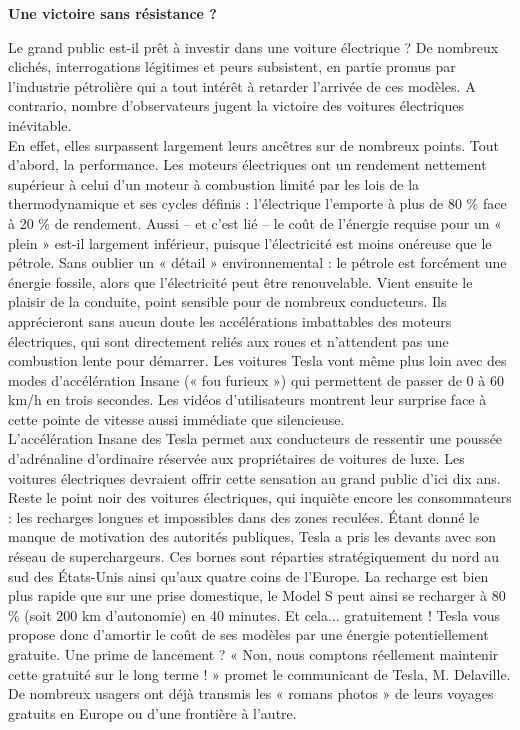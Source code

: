 \documentclass[8pt]{article}
\begin{document}
\textbf{Une victoire sans résistance ?}

Le grand public est-il prêt à investir dans une voiture électrique ? De nombreux clichés, interrogations légitimes et peurs subsistent, en partie promus par l’industrie pétrolière qui a tout intérêt à retarder l’arrivée de ces modèles. A contrario, nombre d’observateurs jugent la victoire des voitures électriques inévitable. \\

En effet, elles surpassent largement leurs ancêtres sur de nombreux points. Tout d’abord, la performance. Les moteurs électriques ont un rendement nettement supérieur à celui d’un moteur à combustion limité par les lois de la thermodynamique et ses cycles définis : l’électrique l’emporte à plus de 80 \% face à 20 \% de rendement. Aussi – et c’est lié – le coût de l’énergie requise pour un « plein » est-il largement inférieur, puisque l’électricité est moins onéreuse que le pétrole. Sans oublier un « détail » environnemental : le pétrole est forcément une énergie fossile, alors que l’électricité peut être renouvelable. Vient ensuite le plaisir de la conduite, point sensible pour de nombreux conducteurs. Ils apprécieront sans aucun doute les accélérations imbattables des moteurs électriques, qui sont directement reliés aux roues et n’attendent pas une combustion lente pour démarrer. Les voitures Tesla vont même plus loin avec des modes d’accélération Insane (« fou furieux ») qui permettent de passer de 0 à 60 km/h en trois secondes. Les vidéos d’utilisateurs montrent leur surprise face à cette pointe de vitesse aussi immédiate que silencieuse. \\

L’accélération Insane des Tesla permet aux conducteurs de ressentir une poussée d’adrénaline d’ordinaire réservée aux propriétaires de voitures de luxe. Les voitures électriques devraient offrir cette sensation au grand public d’ici dix ans.
Reste le point noir des voitures électriques, qui inquiète encore les consommateurs : les recharges longues et impossibles dans des zones reculées. Étant donné le manque de motivation des autorités publiques, Tesla a pris les devants avec son réseau de superchargeurs. Ces bornes sont réparties stratégiquement du nord au sud des États-Unis ainsi qu’aux quatre coins de l’Europe. La recharge est bien plus rapide que sur une prise domestique, le Model S peut ainsi se recharger à 80 \% (soit 200 km d’autonomie) en 40 minutes. Et cela... gratuitement ! Tesla vous propose donc d’amortir le coût de ses modèles par une énergie potentiellement gratuite. Une prime de lancement ? « Non, nous comptons réellement maintenir cette gratuité sur le long terme ! » promet le communicant de Tesla, M. Delaville. De nombreux usagers ont déjà transmis les « romans photos » de leurs voyages gratuits en Europe ou d’une frontière à l’autre. \\
\end{document}
